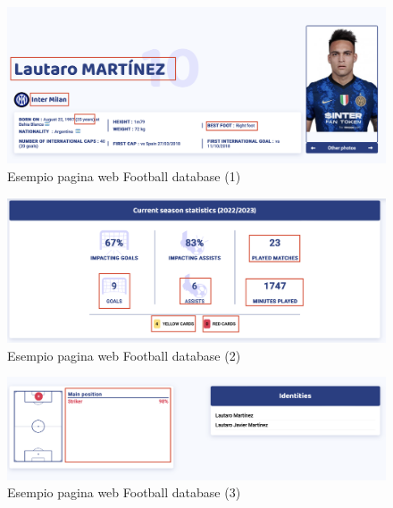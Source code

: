 \begin{figure}
    \centering
    \includegraphics[scale=0.3]{img/footdb1.png}
    \caption{Esempio pagina web Football database (1)}
    \label{fig:footdb1}
\end{figure}
\begin{figure}
    \centering
    \includegraphics[scale=0.3]{img/footdb2.png}
    \caption{Esempio pagina web Football database (2)}
    \label{fig:footdb2}
\end{figure}
\begin{figure}
    \centering
    \includegraphics[scale=0.3]{img/footdb3.png}
    \caption{Esempio pagina web Football database (3)}
    \label{fig:footdb3}
\end{figure}